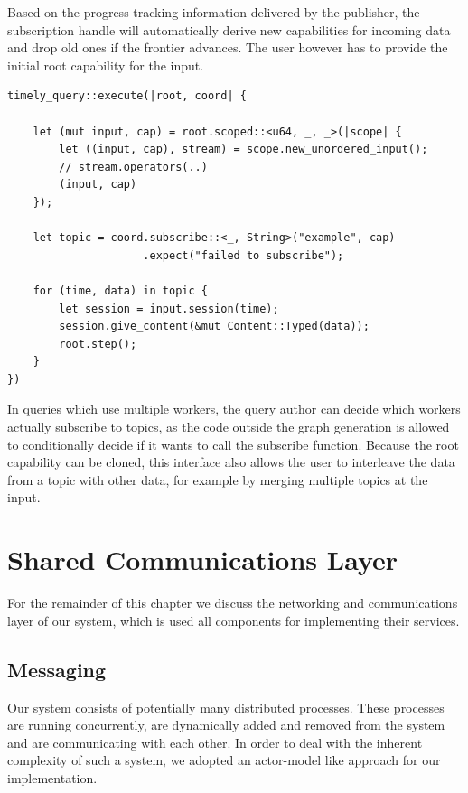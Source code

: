 Based on the progress tracking information delivered by the publisher, the
subscription handle will automatically derive new capabilities for incoming
data and drop old ones if the frontier advances. The user however has to
provide the initial root capability for the input.

\begin{lstlisting}[caption={[Typical use of the subscription handle]
Typical use of the subscription handle. This query subscribes to a single topic of
strings, with \lstinline{u64} being the type of the timestamps.
}]
timely_query::execute(|root, coord| {

    let (mut input, cap) = root.scoped::<u64, _, _>(|scope| {
        let ((input, cap), stream) = scope.new_unordered_input();
        // stream.operators(..)
        (input, cap)
    });

    let topic = coord.subscribe::<_, String>("example", cap)
                     .expect("failed to subscribe");

    for (time, data) in topic {
        let session = input.session(time);
        session.give_content(&mut Content::Typed(data));
        root.step();
    }
})
\end{lstlisting}

In queries which use multiple workers, the query author can decide which workers
actually subscribe to topics, as the code outside the graph generation is allowed
to conditionally decide if it wants to call the subscribe function. Because
the root capability can be cloned, this interface also allows the user to
interleave the data from a topic with other data, for example by merging
multiple topics at the input.

\section{Shared Communications Layer}

For the remainder of this chapter we discuss the networking and communications
layer of our system, which is used all components for implementing their
services.

\subsection{Messaging}

Our system consists of potentially many distributed processes. These processes
are running concurrently, are dynamically added and removed from the system
and are communicating with each other. In order to deal with the inherent
complexity of such a system, we adopted an actor-model like approach for our
implementation.

